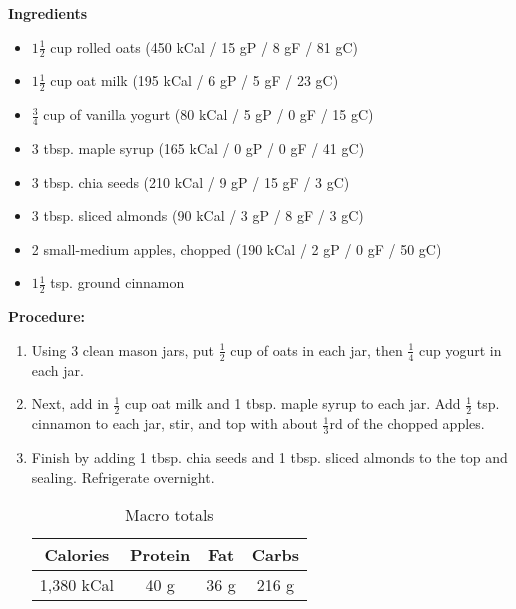 \documentclass{report}
\begin{document}


\bigskip

\bigskip

\begin{multicols}{2}
\textbf{Ingredients}
\begin{itemize}
\item $1\frac{1}{2}$ cup rolled oats \quad (450 kCal / 15 gP / 8 gF / 81 gC)
\item $1\frac{1}{2}$ cup oat milk \quad (195 kCal / 6 gP / 5 gF / 23 gC) 
\item $\frac{3}{4}$ cup of vanilla yogurt \newline (80 kCal / 5 gP / 0 gF / 15 gC) 
\item 3 tbsp. maple syrup \quad (165 kCal / 0 gP / 0 gF / 41 gC)
\item 3 tbsp. chia seeds \quad (210 kCal / 9 gP / 15 gF / 3 gC)
\item 3 tbsp. sliced almonds \quad (90 kCal / 3 gP / 8 gF / 3 gC) 
\item 2 small-medium apples, chopped \newline (190 kCal / 2 gP / 0 gF / 50 gC)
\item $1\frac{1}{2}$ tsp. ground cinnamon




\end{itemize}


\columnbreak
\textbf{Procedure:}
\medskip


\begin{enumerate}
\item Using 3 clean mason jars, put $\frac{1}{2}$ cup of oats in each jar, then $\frac{1}{4}$ cup yogurt in each jar. 

\item Next, add in $\frac{1}{2}$ cup oat milk and 1 tbsp. maple syrup to each jar. Add $\frac{1}{2}$ tsp. cinnamon to each jar, stir, and top with about $\frac{1}{3}$rd of the chopped apples. 

\item Finish by adding 1 tbsp. chia seeds and 1 tbsp. sliced almonds to the top and sealing. Refrigerate overnight.

\begin{table}[H]
  \begin{center}
    \caption{Macro totals}
    \label{tab:table1}
    \begin{tabular}{c|c|c|c} %
      \textbf{Calories} & \textbf{Protein} & \textbf{Fat} & \textbf{Carbs}\\
      \hline
      1,380 kCal & 40 g & 36 g & 216 g\\
    \end{tabular}
  \end{center}
\end{table}
 
\end{enumerate}
\end{multicols}




\end{document}
